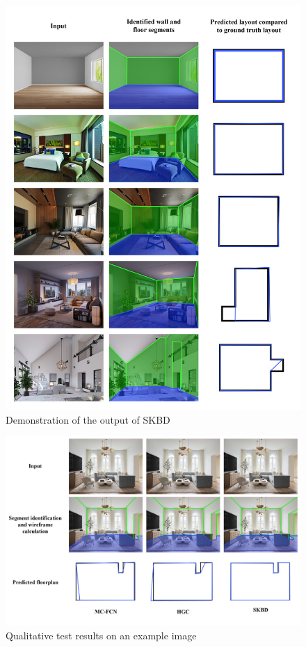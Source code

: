 \begin{figure}[htbp]
\centering
\includegraphics[width=0.9\linewidth]{images/results2.png}
\caption{Demonstration of the output of SKBD}
\label{fig:resultlayouts}
\end{figure}

\begin{figure}[htbp]
\centering
\includegraphics[width=0.9\linewidth]{images/comparison_test_images.png}
\caption{Qualitative test results on an example image}
\label{fig:comparisontest}
\end{figure}

